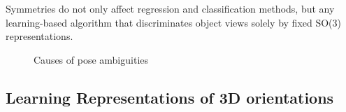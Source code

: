 Symmetries do not only affect regression and classification methods, but any learning-based algorithm that discriminates object views solely by fixed SO(3) representations.


\begin{figure}[t]\centering
	\qquad
	\qquad
	\qquad
	\qquad
	\captionsetup{width=0.23\textwidth,,justification = raggedright}
	\qquad
	\quad
	\captionsetup{width=0.205\textwidth,justification = raggedright}
	\captionsetup{width=0.9\textwidth}
	\caption{Causes of pose ambiguities}
	\label{fig:poseamb}\end{figure}

\subsection{Learning Representations of 3D orientations}

